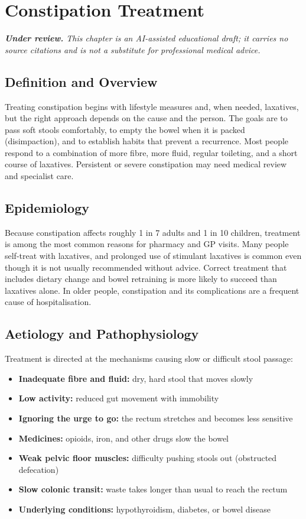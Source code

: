 \chapter{Constipation Treatment}

\medskip
\noindent\textit{\textbf{Under review.} This chapter is an AI-assisted educational draft; it carries no source citations and is not a substitute for professional medical advice.}

\section*{Definition and Overview}
Treating constipation begins with lifestyle measures and, when needed, laxatives, but the right approach depends on the cause and the person. The goals are to pass soft stools comfortably, to empty the bowel when it is packed (disimpaction), and to establish habits that prevent a recurrence. Most people respond to a combination of more fibre, more fluid, regular toileting, and a short course of laxatives. Persistent or severe constipation may need medical review and specialist care.

\section*{Epidemiology}
Because constipation affects roughly 1 in 7 adults and 1 in 10 children, treatment is among the most common reasons for pharmacy and GP visits. Many people self-treat with laxatives, and prolonged use of stimulant laxatives is common even though it is not usually recommended without advice. Correct treatment that includes dietary change and bowel retraining is more likely to succeed than laxatives alone. In older people, constipation and its complications are a frequent cause of hospitalisation.

\section*{Aetiology and Pathophysiology}
Treatment is directed at the mechanisms causing slow or difficult stool passage:
\begin{itemize}
    \item \textbf{Inadequate fibre and fluid:} dry, hard stool that moves slowly
    \item \textbf{Low activity:} reduced gut movement with immobility
    \item \textbf{Ignoring the urge to go:} the rectum stretches and becomes less sensitive
    \item \textbf{Medicines:} opioids, iron, and other drugs slow the bowel
    \item \textbf{Weak pelvic floor muscles:} difficulty pushing stools out (obstructed defecation)
    \item \textbf{Slow colonic transit:} waste takes longer than usual to reach the rectum
    \item \textbf{Underlying conditions:} hypothyroidism, diabetes, or bowel disease
\end{itemize}

